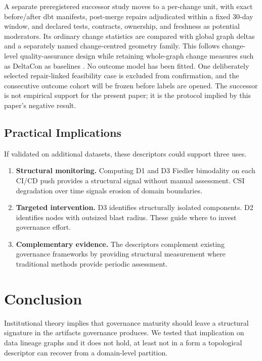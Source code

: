 \documentclass[11pt,a4paper]{article}
\begin{document}
A separate preregistered successor study moves to a per-change unit,
with exact before/after dbt manifests, post-merge repairs adjudicated within
a fixed 30-day window, and declared tests, contracts, ownership, and
freshness as potential moderators. Its ordinary change statistics are
compared with global graph deltas and a separately named change-centred
geometry family. This follows change-level quality-assurance design
\citep{kamei2013large} while retaining whole-graph change measures such
as DeltaCon as baselines \citep{koutra2016deltacon}. No outcome model has
been fitted. One deliberately selected repair-linked feasibility case is
excluded from confirmation, and the consecutive outcome cohort will be
frozen before labels are opened. The successor is not empirical support
for the present paper; it is the protocol implied by this paper's
negative result.

\subsection{Practical Implications}

If validated on additional datasets, these descriptors could support
three uses.

\begin{enumerate}
  \item \textbf{Structural monitoring.} Computing D1 and D3 Fiedler
        bimodality on each CI/CD push provides a structural signal
        without manual assessment. CSI degradation over time signals
        erosion of domain boundaries.
  \item \textbf{Targeted intervention.} D3 identifies structurally
        isolated components. D2 identifies nodes with outsized blast
        radius. These guide where to invest governance effort.
  \item \textbf{Complementary evidence.} The descriptors complement
        existing governance frameworks by providing structural measurement
        where traditional methods provide periodic assessment.
\end{enumerate}

\section{Conclusion}

Institutional theory implies that governance maturity should leave a
structural signature in the artifacts governance produces. We tested
that implication on data lineage graphs and it does not hold, at least
not in a form a topological descriptor can recover from a domain-level
partition.
\end{document}
